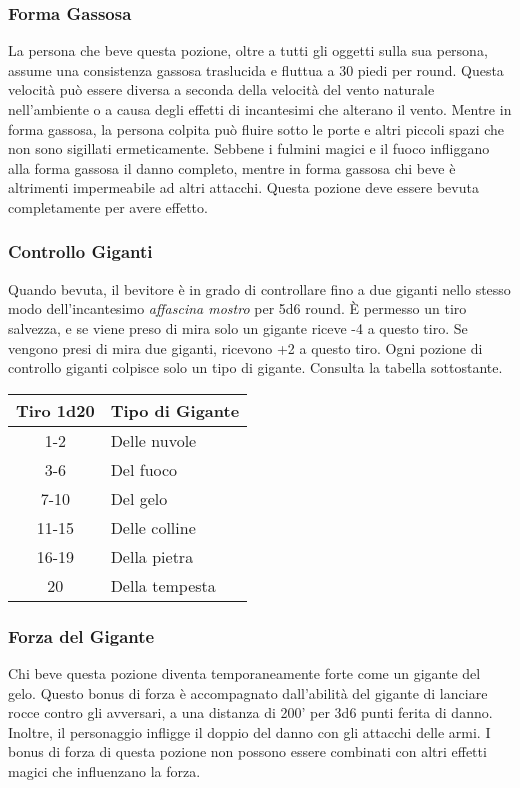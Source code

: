\documentclass{article}
\begin{document}
\begin{multicols}{2}
\subsubsection{Forma Gassosa}
La persona che beve questa pozione, oltre a tutti gli oggetti sulla sua persona, assume una consistenza gassosa traslucida e fluttua a 30 piedi per round. Questa velocità può essere diversa a seconda della velocità del vento naturale nell'ambiente o a causa degli effetti di incantesimi che alterano il vento. Mentre in forma gassosa, la persona colpita può fluire sotto le porte e altri piccoli spazi che non sono sigillati ermeticamente. Sebbene i fulmini magici e il fuoco infliggano alla forma gassosa il danno completo, mentre in forma gassosa chi beve è altrimenti impermeabile ad altri attacchi. Questa pozione deve essere bevuta completamente per avere effetto.

\subsubsection{Controllo Giganti}
Quando bevuta, il bevitore è in grado di controllare fino a due giganti nello stesso modo dell'incantesimo \textit{affascina mostro} per 5d6 round. È permesso un tiro salvezza, e se viene preso di mira solo un gigante riceve -4 a questo tiro. Se vengono presi di mira due giganti, ricevono +2 a questo tiro. Ogni pozione di controllo giganti colpisce solo un tipo di gigante. Consulta la tabella sottostante.

\begin{table}[h]
\centering
\begin{tabular}{|c|l|}
\hline
\textbf{Tiro 1d20} & \textbf{Tipo di Gigante} \\
\hline
1-2 & Delle nuvole \\
3-6 & Del fuoco \\
7-10 & Del gelo \\
11-15 & Delle colline \\
16-19 & Della pietra \\
20 & Della tempesta \\
\hline
\end{tabular}

\end{table}

\subsubsection{Forza del Gigante}
Chi beve questa pozione diventa temporaneamente forte come un gigante del gelo. Questo bonus di forza è accompagnato dall'abilità del gigante di lanciare rocce contro gli avversari, a una distanza di 200' per 3d6 punti ferita di danno. Inoltre, il personaggio infligge il doppio del danno con gli attacchi delle armi. I bonus di forza di questa pozione non possono essere combinati con altri effetti magici che influenzano la forza.


\end{multicols}
\end{document}
